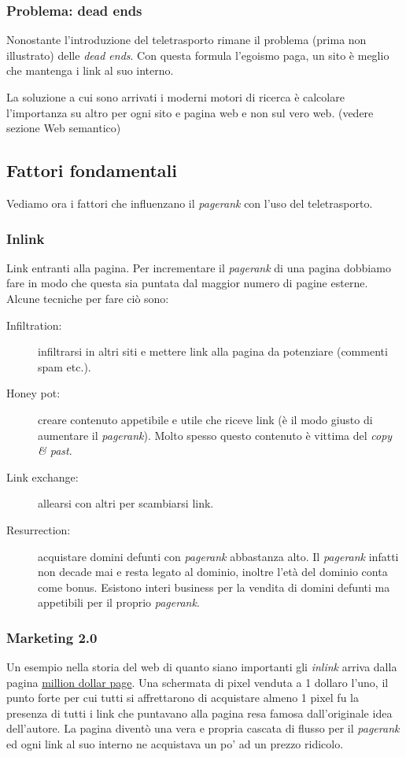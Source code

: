		
			\subsubsection{Problema: dead ends}
				Nonostante l'introduzione del teletrasporto rimane il problema (prima non illustrato) delle \emph{dead ends}. Con questa formula l'egoismo paga, un sito è meglio che mantenga i link al suo interno.
				
				La soluzione a cui sono arrivati i moderni motori di ricerca è calcolare l'importanza su altro per ogni sito e pagina web e non sul vero web. (vedere sezione Web semantico)
		
		\subsection{Fattori fondamentali}
			Vediamo ora i fattori che influenzano il \emph{pagerank} con l'uso del teletrasporto.
		
			\subsubsection{Inlink}
				Link entranti alla pagina. Per incrementare il \emph{pagerank} di una pagina dobbiamo fare in modo che questa sia puntata dal maggior numero di pagine esterne. Alcune tecniche per fare ciò sono:
				\begin{description}
					\item[Infiltration:] infiltrarsi in altri siti e mettere link alla pagina da potenziare (commenti spam etc.).
					\item[Honey pot:] creare contenuto appetibile e utile che riceve link (è il modo giusto di aumentare il \emph{pagerank}). Molto spesso questo contenuto è vittima del \emph{copy \& past}.
					\item[Link exchange:] allearsi con altri per scambiarsi link.
					\item[Resurrection:] acquistare domini defunti con \emph{pagerank} abbastanza alto. Il \emph{pagerank} infatti non decade mai e resta legato al dominio, inoltre l'età del dominio conta come bonus. Esistono interi business per la vendita di domini defunti ma appetibili per il proprio \emph{pagerank}.
				\end{description}
				
				\subsubsection{Marketing 2.0}
				Un esempio nella storia del web di quanto siano importanti gli \emph{inlink} arriva dalla pagina \href{http://www.milliondollarhomepage.com/}{million dollar page}. Una schermata di pixel venduta a 1 dollaro l'uno, il punto forte per cui tutti si affrettarono di acquistare almeno 1 pixel fu la presenza di tutti i link che puntavano alla pagina resa famosa dall'originale idea dell'autore. La pagina diventò una vera e propria cascata di flusso per il \emph{pagerank} ed ogni link al suo interno ne acquistava un po' ad un prezzo ridicolo.
			
